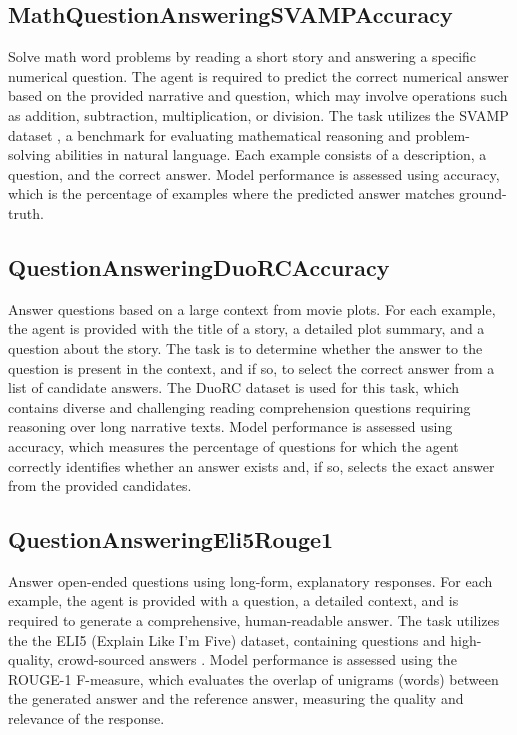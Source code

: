 \documentclass{fairmeta}
\begin{document}
\subsection{MathQuestionAnsweringSVAMPAccuracy}

Solve math word problems by reading a short story and answering a specific numerical question. The agent is required to predict the correct numerical answer based on the provided narrative and question, which may involve operations such as addition, subtraction, multiplication, or division. The task utilizes the SVAMP dataset \citep{patel2021nlp}, a benchmark for evaluating mathematical reasoning and problem-solving abilities in natural language. Each example consists of a description, a question, and the correct answer. Model performance is assessed using accuracy, which is the percentage of examples where the predicted answer matches ground-truth.

\subsection{QuestionAnsweringDuoRCAccuracy}

Answer questions based on a large context from movie plots. For each example, the agent is provided with the title of a story, a detailed plot summary, and a question about the story. The task is to determine whether the answer to the question is present in the context, and if so, to select the correct answer from a list of candidate answers. The DuoRC dataset \citep{saha2018duorc} is used for this task, which contains diverse and challenging reading comprehension questions requiring reasoning over long narrative texts. Model performance is assessed using accuracy, which measures the percentage of questions for which the agent correctly identifies whether an answer exists and, if so, selects the exact answer from the provided candidates.

\subsection{QuestionAnsweringEli5Rouge1}

Answer open-ended questions using long-form, explanatory responses. For each example, the agent is provided with a question, a detailed context, and is required to generate a comprehensive, human-readable answer. The task utilizes the the ELI5 (Explain Like I'm Five) dataset, containing questions and high-quality, crowd-sourced answers \citep{fan2019eli5}. Model performance is assessed using the ROUGE-1 F-measure, which evaluates the overlap of unigrams (words) between the generated answer and the reference answer, measuring the quality and relevance of the response.
\end{document}
